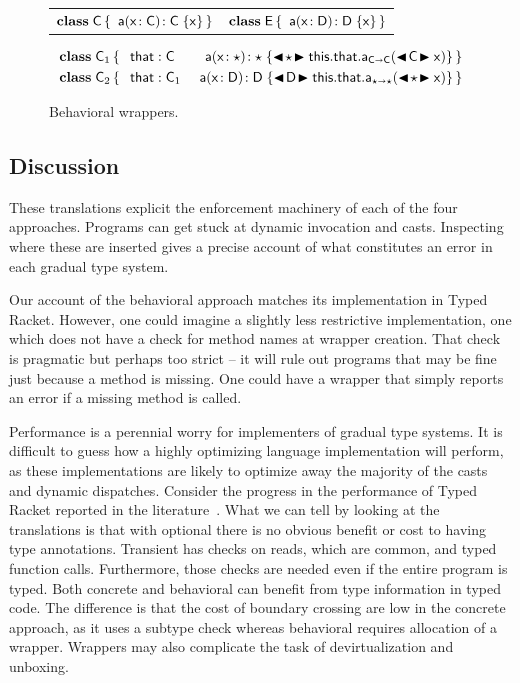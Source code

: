 \documentclass[a4paper,USenglish]{lipics-v2018}
\newcommand{\HS}{\hspace{.2cm}}
\newcommand{\EM}[1]{\ensuremath{#1}\xspace}
\newcommand{\xt}[1]{{\sf{#1}}}
\newcommand{\bt}[1]{\xt{\bf #1}}
\newcommand{\EMxt}[1]{\EM{\xt{#1}}}
\newcommand{\x}{\EMxt x}
\newcommand{\any}{\EM{\star}}
\newcommand{\this}{\EMxt{this}}
\newcommand{\that}{\EMxt{that}}
\newcommand{\KCall}[5]{\EM{{#1}.{#2}_{{#4} \shortrightarrow {#5}}(#3)}}
\newcommand{\BehStart}{\EM{\blacktriangleleft}}
\newcommand{\BehEnd}{\EM{\blacktriangleright}}
\newcommand{\BehCast}[2]{\EM{\BehStart\! #1\! \BehEnd #2}}
\newcommand{\HT}[2]{\EM{{#1}\!:{#2}}}
\newcommand{\Mdef}[5]{\EM{ \HT{ #1( \HT{#2}{#3})}{#4}\;\{{#5}\}}}
\newcommand{\Class}[3]{\EM{\bt{class}\;#1\,\{\,#2~#3\,\}}}
\newcounter{lem}
\begin{document}
\begin{figure}[h!]\hrulefill\vspace{2mm}

\begin{tabularx}{\textwidth}{XX}
\Class\C{}{\Mdef{\xt{a}}\x\C\C\x} & \Class{\xt E}{}{\Mdef{\xt{a}}\x\D\D\x}
\end{tabularx}

\vspace{-4mm}
\begin{align*}
\Class{\C_1}{\HS&\that : \C}{&\Mdef{\xt{a}}\x\any\any{\BehCast\any{\KCall{\this.\that}{\xt{a}}{\BehCast\C\x}\C\C}}} \\
\Class{\C_2}{\HS &\that : \C_1}{&\Mdef{\xt{a}}\x\D\D{\BehCast\D{\KCall{\this.\that}{\xt{a}}{\BehCast\any\x}\any\any}}}
\end{align*}
\vspace{-8mm}

\hrulefill
\caption{Behavioral wrappers.}\label{fig:behex}
\end{figure}

\subsection{Discussion}

These translations explicit the enforcement machinery of each of the four
approaches. Programs can get stuck at dynamic invocation and
casts. Inspecting where these are inserted gives a precise account of what
constitutes an error in each gradual type system.

Our account of the behavioral approach matches its implementation in Typed
Racket. However, one could imagine a slightly less restrictive implementation,
one which does not have a check for method names at wrapper creation. That
check is pragmatic but perhaps too strict -- it will rule out programs that
may be fine just because a method is missing. One could have a wrapper that
simply reports an error if a missing method is called.

Performance is a perennial worry for implementers of gradual type systems.
It is difficult to guess how a highly optimizing language
implementation will perform, as these implementations are likely to optimize
away the majority of the casts and dynamic dispatches. Consider the progress
in the performance of Typed Racket reported in the
literature~\cite{popl16,OnlyMostly}. What we can tell by looking at the
translations is that with optional there is no obvious benefit or cost to
having type annotations. Transient has checks on reads, which are common,
and typed function calls. Furthermore, those checks are needed even if the
entire program is typed. Both concrete and behavioral can benefit from type
information in typed code. The difference is that the cost of boundary
crossing are low in the concrete approach, as it uses a subtype check whereas
behavioral requires allocation of a wrapper. Wrappers 
may also complicate the task of devirtualization and unboxing.
\end{document}

